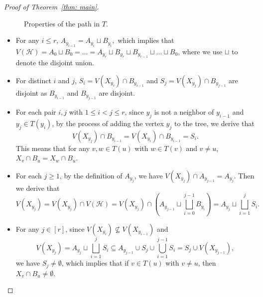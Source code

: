 \documentclass[11pt,a4paper]{article}
\begin{document}
\begin{proof}[Proof of Theorem~\ref{thm: main}]
\begin{figure}[ht]
\caption{Properties of the path in $T$.}
    \label{fig}
\end{figure}
\begin{itemize}
    \item For any $i \le r$, $A_{y_{i-1}}= A_{y_i} \sqcup B_{y_i},$ which implies that $V(\mathcal{H}) =A_0 \sqcup B_0 =\dots = A_{y_r} \sqcup B_{y_r} \sqcup B_{y_{r-1}} \sqcup \dots \sqcup B_0$, where we use $\sqcup$ to denote the disjoint union.
    \item For distinct $i$ and $j$, $S_i= V(X_{y_i})\cap B_{y_{i-1}}$ and $S_j = V(X_{y_j})\cap B_{y_{j-1}}$ are disjoint as $B_{y_{i-1}}$ and $B_{y_{j-1}}$ are disjoint.
    \item For each pair $i,j$ with $1\le i<j \le r$, since $y_j$ is not a neighbor of $y_{i-1}$ and $y_j\in T(y_i)$, by the process of adding the vertex $y_{j}$ to the tree, we derive that 
    \[V(X_{y_j}) \cap B_{y_{i-1}}=V(X_{y_i}) \cap B_{y_{i-1}} =S_i.\] 
    This means that for any $v,w\in  T(u)$ with $w\in T(v)$ and $v\ne u$, $X_v \cap B_u = X_w \cap B_u$.
    
    \item For each $j \ge 1$, by the definition of $A_{y_{j}}$, we have $V(X_{y_j})\cap A_{y_{j-1}} =A_{y_j}$. Then we derive that
    \[
    V(X_{y_j})= V(X_{y_j})\cap V(\mathcal{H}) =  V(X_{y_j}) \cap \left(A_{y_{j-1}}\sqcup \bigsqcup^{j-1}_{i=0} B_{y_{i}}\right) =  A_{y_j}\sqcup\bigsqcup^{j}_{i=1}  S_i  .
    \]
    \item For any $j\in[r]$, since $V(X_{y_i}) \not\subseteq V(X_{y_{i-1}})$ and
    \[V(X_{y_{j}}) = A_{y_j}\sqcup \bigsqcup^j_{i=1}S_i \subseteq A_{y_{j-1}}\cup S_j \cup \bigcup^{j-1}_{i=1}S_i = S_j \cup V(X_{y_{j-1}}),
    \] we have $S_j \ne \emptyset$, which implies that if $v\in  T(u)$ with $v\ne u$, then $X_v \cap B_u \ne \emptyset$.
\end{itemize}


\end{proof}
\end{document}
